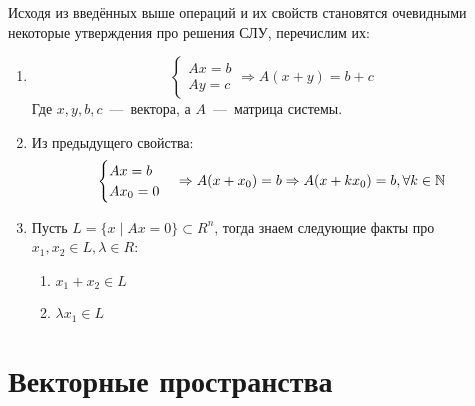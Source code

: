 \begin{rem}
    Исходя из введённых выше операций и их свойств становятся очевидными некоторые утверждения
    про решения СЛУ, перечислим их:
    \begin{enumerate}
        \item
            $$
            \begin{cases}
                Ax = b\\
                Ay = c
            \end{cases}\Rightarrow
            A(x+y) = b+c
            $$
            Где $x,y,b,c$~---~вектора, а $A$~---~матрица системы.
        \item
            Из предыдущего свойства:
            $$
            \begin{cases}
                Ax=b\\
                Ax_0=0
            \end{cases}\Rightarrow
            A(x+x_0)=b\Rightarrow A(x + kx_0) = b, \forall k\in \mathbb{N}
            $$
        \item
            Пусть $L = \{x\mid Ax=0\}\subset R^n$, тогда знаем следующие факты про 
            $x_1, x_2\in L, \lambda \in R$:
            \begin{enumerate}
                \item $x_1 + x_2 \in L$
                \item $\lambda x_1 \in L$
            \end{enumerate}
    \end{enumerate}
\end{rem}
\section{Векторные пространства}
